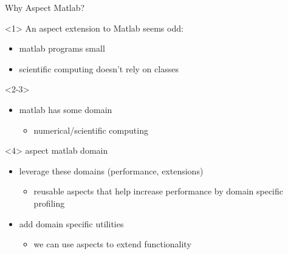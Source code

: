 \begin{frame}{Why Aspect Matlab?}
  \begin{onlyenv}<1>
    An aspect extension to Matlab seems odd:
    \begin{itemize}
    \item matlab programs small %
    \item scientific computing doesn't rely on classes
    \end{itemize}
  \end{onlyenv}
  \begin{onlyenv}<2-3>
     
    \begin{itemize}
    \item matlab has some domain
      \begin{itemize}
      \item numerical/scientific computing
      \end{itemize}
    \end{itemize}
  \end{onlyenv}
  \begin{onlyenv}<4>
    aspect matlab domain
    \begin{itemize}
    \item leverage these domains (performance, extensions)
      \begin{itemize}
      \item reusable aspects that help increase performance
        by domain specific profiling
      \end{itemize}
    \item add domain specific utilities
      \begin{itemize}
      \item we can use aspects to extend functionality
      \end{itemize}
    \end{itemize}
  \end{onlyenv}
\end{frame}


